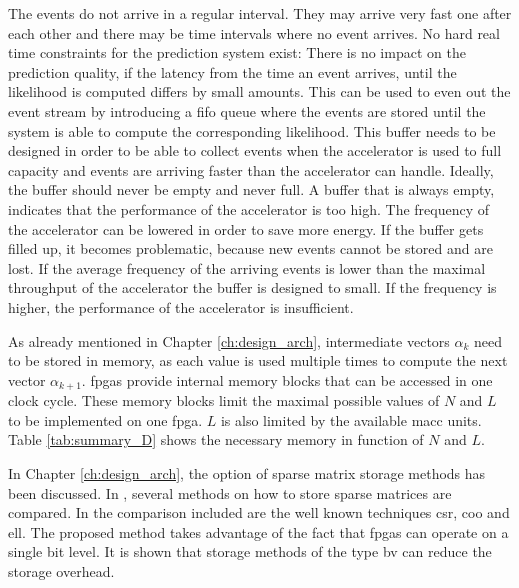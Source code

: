 \documentclass[mscthesis]{usiinfthesis}
\begin{document}
The events do not arrive in a regular interval. They may arrive very fast one
after each other and there may be time intervals where no event arrives. No
hard real time constraints for the prediction system exist: There is no impact
on the prediction quality, if the latency from the time an event arrives, until
the likelihood is computed differs by small amounts. This can be used to even
out the event stream by introducing a \gls{fifo} queue where the events are
stored until the system is able to compute the corresponding likelihood. This
buffer needs to be designed in order to be able to collect events when the
accelerator is used to full capacity and events are arriving faster than the
accelerator can handle. Ideally, the buffer should never be empty and never
full. A buffer that is always empty, indicates that the performance of the
accelerator is too high. The frequency of the accelerator can be lowered in
order to save more energy. If the buffer gets filled up, it becomes
problematic, because new events cannot be stored and are lost. If the average
frequency of the arriving events is lower than the maximal throughput of the
accelerator the buffer is designed to small. If the frequency is higher, the
performance of the accelerator is insufficient.

As already mentioned in Chapter \ref{ch:design_arch}, intermediate vectors
$\alpha_k$ need to be stored in memory, as each value is used multiple times to
compute the next vector $\alpha_{k+1}$. \glspl{fpga} provide internal memory
blocks that can be accessed in one clock cycle. These memory blocks limit the
maximal possible values of $N$ and $L$ to be implemented on one \gls{fpga}. $L$
is also limited by the available \gls{macc} units. Table \ref{tab:summary_D}
shows the necessary memory in function of $N$ and $L$.

In Chapter \ref{ch:design_arch}, the option of sparse matrix storage methods
has been discussed. In \cite{FCCM12_Kestur}, several methods on how to store
sparse matrices are compared. In the comparison included are the well known
techniques \gls{csr}, \gls{coo} and \gls{ell}. The proposed method takes
advantage of the fact that \glspl{fpga} can operate on a single bit level. It
is shown that storage methods of the type \gls{bv} can reduce the storage
overhead.
\end{document}
